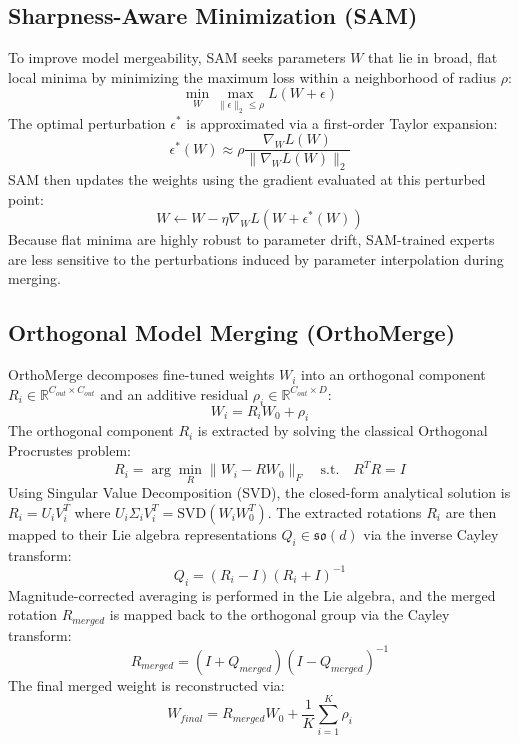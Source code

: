 \documentclass{article}
\theoremstyle{plain}
\theoremstyle{definition}
\theoremstyle{remark}
\begin{document}
\subsection{Sharpness-Aware Minimization (SAM)}
To improve model mergeability, SAM \cite{foret2021sharpness} seeks parameters $W$ that lie in broad, flat local minima by minimizing the maximum loss within a neighborhood of radius $\rho$:
\begin{equation}
    \min_{W} \max_{\|\epsilon\|_2 \le \rho} L(W + \epsilon)
\end{equation}
The optimal perturbation $\epsilon^*$ is approximated via a first-order Taylor expansion:
\begin{equation}
    \epsilon^*(W) \approx \rho \frac{\nabla_W L(W)}{\|\nabla_W L(W)\|_2}
\end{equation}
SAM then updates the weights using the gradient evaluated at this perturbed point:
\begin{equation}
    W \leftarrow W - \eta \nabla_W L(W + \epsilon^*(W))
\end{equation}
Because flat minima are highly robust to parameter drift, SAM-trained experts are less sensitive to the perturbations induced by parameter interpolation during merging.

\subsection{Orthogonal Model Merging (OrthoMerge)}
OrthoMerge \cite{yang2026orthogonal} decomposes fine-tuned weights $W_i$ into an orthogonal component $R_i \in \mathbb{R}^{C_{out} \times C_{out}}$ and an additive residual $\rho_i \in \mathbb{R}^{C_{out} \times D}$:
\begin{equation}
    W_i = R_i W_0 + \rho_i
\end{equation}
The orthogonal component $R_i$ is extracted by solving the classical Orthogonal Procrustes problem:
\begin{equation}
    R_i = \arg\min_{R} \|W_i - R W_0\|_F \quad \text{s.t.} \quad R^T R = I
\end{equation}
Using Singular Value Decomposition (SVD), the closed-form analytical solution is $R_i = U_i V_i^T$ where $U_i \Sigma_i V_i^T = \text{SVD}(W_i W_0^T)$.
The extracted rotations $R_i$ are then mapped to their Lie algebra representations $Q_i \in \mathfrak{so}(d)$ via the inverse Cayley transform:
\begin{equation}
    Q_i = (R_i - I)(R_i + I)^{-1}
\end{equation}
Magnitude-corrected averaging is performed in the Lie algebra, and the merged rotation $R_{merged}$ is mapped back to the orthogonal group via the Cayley transform:
\begin{equation}
    R_{merged} = (I + Q_{merged})(I - Q_{merged})^{-1}
\end{equation}
The final merged weight is reconstructed via:
\begin{equation}
    W_{final} = R_{merged} W_0 + \frac{1}{K}\sum_{i=1}^K \rho_i
\end{equation}
\end{document}
